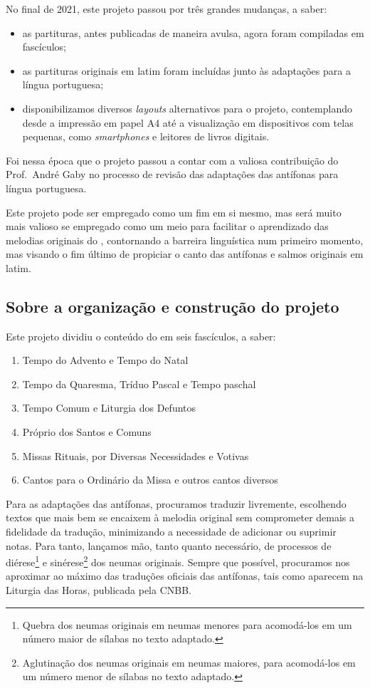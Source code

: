 No final de 2021, este projeto passou por três grandes mudanças, a saber:
\begin{itemize}
  \item as partituras, antes publicadas de maneira avulsa, agora foram compiladas em fascículos;

  \item as partituras originais em latim foram incluídas junto às adaptações para a língua portuguesa;

  \item disponibilizamos diversos \emph{layouts} alternativos para o projeto, contemplando desde a impressão em papel A4 até a visualização em dispositivos com telas pequenas, como \emph{smartphones} e leitores de livros digitais.
\end{itemize}
Foi nessa época que o projeto passou a contar com a valiosa contribuição do Prof.\ André Gaby no processo de revisão das adaptações das antífonas para língua portuguesa.

Este projeto pode ser empregado como um fim em si mesmo, mas será muito mais valioso se empregado como um meio para facilitar o aprendizado das melodias originais do {\GS}, contornando a barreira linguística num primeiro momento, mas visando o fim último de propiciar o canto das antífonas e salmos originais em latim.

\subsection{Sobre a organização e construção do projeto}

Este projeto dividiu o conteúdo do {\GS} em seis fascículos, a saber:
\begin{enumerate}[I:]
  \item Tempo do Advento e Tempo do Natal
  \item Tempo da Quaresma, Tríduo Pascal e Tempo paschal
  \item Tempo Comum e Liturgia dos Defuntos
  \item Próprio dos Santos e Comuns
  \item Missas Rituais, por Diversas Necessidades e Votivas
  \item Cantos para o Ordinário da Missa e outros cantos diversos
\end{enumerate}

Para as adaptações das antífonas, procuramos traduzir livremente, escolhendo textos que mais bem se encaixem à melodia original sem comprometer demais a fidelidade da tradução, minimizando a necessidade de adicionar ou suprimir notas. Para tanto, lançamos mão, tanto quanto necessário, de processos de diérese\footnote{Quebra dos neumas originais em neumas menores para acomodá-los em um número maior de sílabas no texto adaptado.} e sinérese\footnote{Aglutinação dos neumas originais em neumas maiores, para acomodá-los em um número menor de sílabas no texto adaptado.} dos neumas originais. Sempre que possível, procuramos nos aproximar ao máximo das traduções oficiais das antífonas, tais como aparecem na Liturgia das Horas, publicada pela CNBB.

